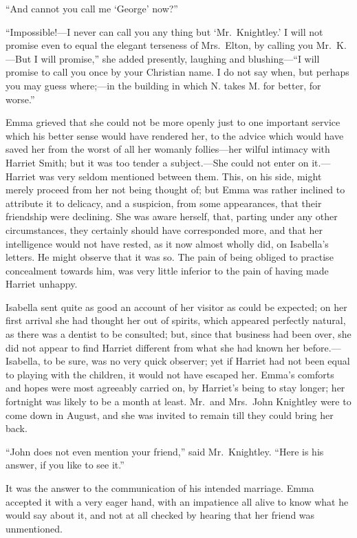``And cannot you call me `George' now?''

``Impossible!---I never can call you any thing but `Mr.\ Knightley.'
I will not promise even to equal the elegant terseness of Mrs.\ Elton,
by calling you Mr.\ K.---But I will promise,'' she added presently,
laughing and blushing---``I will promise to call you once by your
Christian name.  I do not say when, but perhaps you may guess
where;---in the building in which N. takes M. for better, for worse.''

Emma grieved that she could not be more openly just to one
important service which his better sense would have rendered her,
to the advice which would have saved her from the worst of all
her womanly follies---her wilful intimacy with Harriet Smith;
but it was too tender a subject.---She could not enter on it.---%
Harriet was very seldom mentioned between them.  This, on his side,
might merely proceed from her not being thought of; but Emma
was rather inclined to attribute it to delicacy, and a suspicion,
from some appearances, that their friendship were declining.
She was aware herself, that, parting under any other circumstances,
they certainly should have corresponded more, and that her
intelligence would not have rested, as it now almost wholly did,
on Isabella's letters.  He might observe that it was so.  The pain
of being obliged to practise concealment towards him, was very little
inferior to the pain of having made Harriet unhappy.

Isabella sent quite as good an account of her visitor as could
be expected; on her first arrival she had thought her out of spirits,
which appeared perfectly natural, as there was a dentist to
be consulted; but, since that business had been over, she did not
appear to find Harriet different from what she had known her before.---%
Isabella, to be sure, was no very quick observer; yet if Harriet
had not been equal to playing with the children, it would not have
escaped her.  Emma's comforts and hopes were most agreeably carried on,
by Harriet's being to stay longer; her fortnight was likely to be
a month at least.  Mr.\ and Mrs.\ John Knightley were to come down
in August, and she was invited to remain till they could bring her back.

``John does not even mention your friend,'' said Mr.\ Knightley.
``Here is his answer, if you like to see it.''

It was the answer to the communication of his intended marriage.
Emma accepted it with a very eager hand, with an impatience all alive
to know what he would say about it, and not at all checked by hearing
that her friend was unmentioned.


